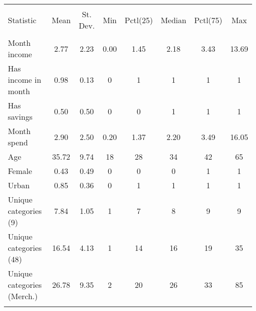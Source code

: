 
\begin{tabular}{@{\extracolsep{5pt}}lccccccc} 
\\[-1.8ex]\hline 
\hline \\[-1.8ex] 
Statistic & \multicolumn{1}{c}{Mean} & \multicolumn{1}{c}{St. Dev.} & \multicolumn{1}{c}{Min} & \multicolumn{1}{c}{Pctl(25)} & \multicolumn{1}{c}{Median} & \multicolumn{1}{c}{Pctl(75)} & \multicolumn{1}{c}{Max} \\ 
\hline \\[-1.8ex] 
Month income & 2.77 & 2.23 & 0.00 & 1.45 & 2.18 & 3.43 & 13.69 \\ 
Has income in month & 0.98 & 0.13 & 0 & 1 & 1 & 1 & 1 \\ 
Has savings & 0.50 & 0.50 & 0 & 0 & 1 & 1 & 1 \\ 
Month spend & 2.90 & 2.50 & 0.20 & 1.37 & 2.20 & 3.49 & 16.05 \\ 
Age & 35.72 & 9.74 & 18 & 28 & 34 & 42 & 65 \\ 
Female & 0.43 & 0.49 & 0 & 0 & 0 & 1 & 1 \\ 
Urban & 0.85 & 0.36 & 0 & 1 & 1 & 1 & 1 \\ 
Unique categories (9) & 7.84 & 1.05 & 1 & 7 & 8 & 9 & 9 \\ 
Unique categories (48) & 16.54 & 4.13 & 1 & 14 & 16 & 19 & 35 \\ 
Unique categories (Merch.) & 26.78 & 9.35 & 2 & 20 & 26 & 33 & 85 \\ 
\hline \\[-1.8ex] 
\end{tabular} 
